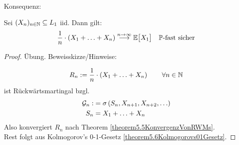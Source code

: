 Konsequenz:

\begin{theorem}\label{theorem5.7StarkesGesetzDerGrossenZahlen}\enter
Sei $(X_n)_{n\in\mathbb{N}}\subseteq L_1$ iid. Dann gilt:
\begin{align*}
\frac{1}{n}\cdot\left(X_1+\ldots+X_n\right)\stackrel{n\to\infty}{\longrightarrow}\mathbb{E}\big[X_1\big]\quad\mathbb{P}\text{-fast sicher}
\end{align*}
\end{theorem}

\begin{proof}
Übung. Beweisskizze/Hinweise:

\begin{align*}
R_n:=\frac{1}{n}\cdot\left(X_1+\ldots+X_n\right)\qquad\forall n\in\mathbb{N}
\end{align*}
ist Rückwärtsmartingal bzgl.
\begin{align*}
\mathcal{G}_n:&=\sigma\left(S_n,X_{n+1},X_{n+2},\ldots\right)\\
S_n&=X_1+\ldots+X_n
\end{align*}
Also konvergiert $R_n$ nach Theorem \ref{theorem5.5KonvergenzVonRWMs}.\\
Rest folgt aus Kolmogorov's 0-1-Gesetz \ref{theorem5.6Kolmogorovs01Gesetz}.
\end{proof}
